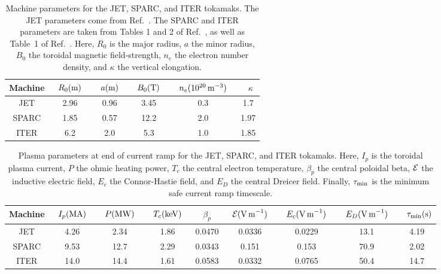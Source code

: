 \documentclass[12pt,prb,aps]{revtex4-1}
\begin{document}
\newpage 
\begin{table}
\begin{tabular}{cccccc}\hline
Machine & ~$R_0({\rm m})$~ & ~$a({\rm m})$~ & ~$B_0({\rm T})$~ & ~$n_e(10^{20}\,{\rm m}^{-3})$~ & ~$\kappa$\\ \hline
JET & 2.96 & 0.96 & 3.45 & 0.3& 1.7\\[0.5ex]
SPARC & 1.85 & 0.57 & 12.2 & 2.0 & 1.97\\[0.5ex]
ITER & 6.2 & 2.0 & 5.3 & 1.0 & 1.85
\end{tabular}
\caption{Machine parameters for the JET, SPARC, and ITER tokamaks. 
The JET parameters come from Ref.~. 
The SPARC and ITER parameters are taken from Tables 1 and 2 of Ref.~, as well as Table~1 of Ref.~. 
Here, $R_0$ is the major radius, $a$ the minor radius, $B_0$ the toroidal magnetic field-strength, $n_e$ the electron number
density, and $\kappa$ the vertical elongation.}\label{t1}
\end{table}

\begin{table}
\begin{tabular}{ccccccccc}\hline
Machine & ~$I_p({\rm MA})$~ & ~$P({\rm MW})$~ & ~$T_c({\rm keV})$~ &~$\beta_p$~& ~${\cal E}({\rm V\,m}^{-1})$~ & ~$E_c({\rm V\,m}^{-1})$~ & ~$E_D({\rm V\,m}^{-1})$~& ~$\tau_{\rm min}({\rm s)}$\\ \hline
JET & 4.26 & 2.34& 1.86  &0.0470& 0.0336&0.0229&13.1 & 4.19\\[0.5ex]
SPARC & 9.53& 12.7 & 2.29  &0.0343& 0.151&0.153&70.9& 2.02\\[0.5ex]
ITER & 14.0 & 14.4 & 1.61  &0.0583& 0.0332&0.0765& 50.4&14.7
\end{tabular}
\caption{Plasma parameters at end of current ramp for the JET, SPARC, and ITER tokamaks. Here, $I_p$ is the toroidal plasma current, $P$ the
ohmic heating power, $T_c$ the central electron temperature, $\beta_p$ the central poloidal beta, ${\cal E}$ the inductive
electric field, $E_c$ the Connor-Hastie field, and $E_D$ the central Dreicer field. Finally, $\tau_{\rm min}$ is the minimum safe current ramp timescale.  }\label{t2}
\end{table}
\end{document}
